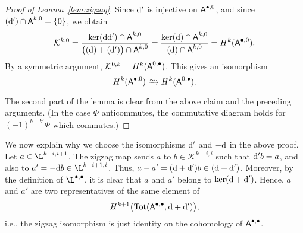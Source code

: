 \documentclass[11pt]{amsart}
\theoremstyle{definition}
\newenvironment{remark}
  {\pushQED{\qed}\renewcommand{\qedsymbol}{$\diamond$}\remm}
  {\popQED\endremm}
\numberwithin{equation}{section}
\newcommand{\ie}{i.e.}
\renewcommand{\~}{\widetilde}
\newcommand{\simto}{\xrightarrow{\raisebox{-3pt}[0pt][0pt]{\small$\hspace{-1pt}\sim$}}}
\newcommand{\bul}{\bullet} %
\let\Im\relax
\DeclareMathOperator{\Im}{Im} %
\DeclareMathOperator{\Tot}{Tot} %
\renewcommand{\d}{{\rm d}} %
\newcommand{\K}{\mathcal K} %
\renewcommand{\AA}{\textnormal{\textsf{A}}}
\begin{document}
{\begin{proof}[Proof of Lemma~\ref{lem:zigzag}]
\medskip

Since $\d'$ is injective on $\AA^{\bul,0}$, and since $\Im(\d')\cap\AA^{k,0}=\{0\}$, we obtain
\[ \K^{k,0}=\frac{\ker(\d\d')\cap\AA^{k,0}}{\bigl(\Im(\d)+\Im(\d')\bigr)\cap\AA^{k,0}}=\frac{\ker(\d)\cap\AA^{k,0}}{\Im(\d)\cap\AA^{k,0}}=H^k(\AA^{\bul,0}). \]
By a symmetric argument, $\K^{0,k}=H^k(\AA^{0,\bul})$. This gives an isomorphism
\[ H^k(\AA^{\bul,0})\simto H^k(\AA^{0,\bul}). \]

The second part of the lemma is clear from the above claim and the preceding arguments. (In the case $\Phi$ anticommutes, the commutative diagram holds for $(-1)^{b+b'}\Phi$ which commutes.)
\end{proof}

\begin{remark} \label{rem:preserve_cohomology}
We now explain why we choose the isomorphisms $\d'$ and $-\d$ in the above proof. Let $a\in\L^{k-i,i+1}$. The zigzag map sends $a$ to $b\in\K^{k-i,i}$ such that $\d'b=a$, and also to $a'=-\d b\in\L^{k-i+1,i}$. Thus, $a-a'=(\d+\d')b\in\Im(\d+\d')$. Moreover, by the definition of $\L^{\bul,\bul}$, it is clear that $a$ and $a'$ belong to $\ker(\d+\d')$. Hence, $a$ and $a'$ are two representatives of the same element of
\[ H^{k+1}\bigl(\Tot(\AA^{\bul,\bul}, \d+\d')\bigr), \]
\ie, the zigzag isomorphism is just identity on the cohomology of $\AA^{\bul,\bul}$.
\end{remark}
}
\end{document}
